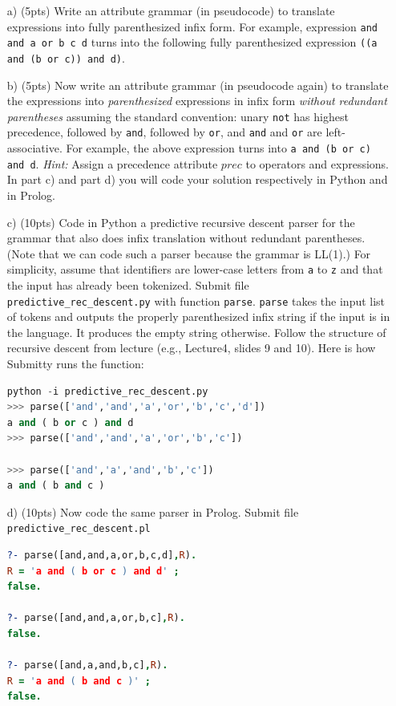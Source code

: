 \documentclass[11pt]{amsart}
\begin{document}
\begin{itemize}

\item[a)] (5pts) Write an attribute grammar (in pseudocode) to translate expressions into fully parenthesized infix form. For example, 
expression \texttt{and and a or b c d} turns into the following fully parenthesized expression \texttt{((a and (b or c)) and d)}. 
\item[b)] (5pts) Now write an attribute grammar (in pseudocode again) to translate the expressions into \emph{parenthesized} 
expressions in infix form \emph{without redundant parentheses} assuming the standard convention: unary \texttt{not} has highest precedence, 
followed by \texttt{and}, followed by \texttt{or}, and \texttt{and} and \texttt{or} are left-associative. For example, the above expression 
turns into \texttt{a and (b or c) and d}. \emph{Hint:} Assign a precedence attribute $\mathit{prec}$ to operators and expressions. 
In part c) and part d) you will code your solution respectively in Python and in Prolog. 

\item[c)] (10pts) Code in Python a predictive recursive descent parser for the grammar that also does infix translation without redundant parentheses. (Note that we can code such a parser because the grammar is LL(1).) For simplicity, assume that identifiers are lower-case letters from \texttt{a} to \texttt{z} and that the input has already been tokenized. Submit file \texttt{predictive\_rec\_descent.py} with function \texttt{parse}. \texttt{parse} takes the input list of tokens and outputs the properly parenthesized infix string if the input is in the language. It produces the empty string otherwise. Follow the structure of recursive descent from lecture (e.g., Lecture4, slides 9 and 10).  Here is how Submitty runs the function: 

\begin{lstlisting}[language=Python]
python -i predictive_rec_descent.py
>>> parse(['and','and','a','or','b','c','d'])
a and ( b or c ) and d
>>> parse(['and','and','a','or','b','c'])

>>> parse(['and','a','and','b','c'])
a and ( b and c )

\end{lstlisting}

\item[d)] (10pts) Now code the same parser in Prolog. Submit file \texttt{predictive\_rec\_descent.pl}

\begin{lstlisting}[language=Prolog]
?- parse([and,and,a,or,b,c,d],R).
R = 'a and ( b or c ) and d' ;
false.

?- parse([and,and,a,or,b,c],R).
false.

?- parse([and,a,and,b,c],R).
R = 'a and ( b and c )' ;
false.
\end{lstlisting}


\end{itemize}
\end{document}
